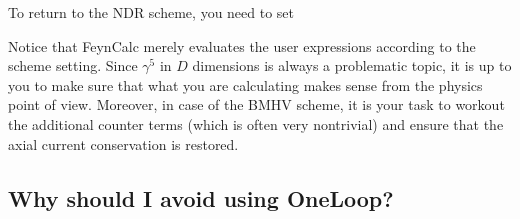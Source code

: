\documentclass[../FeynCalcManual.tex]{subfiles}
\begin{document}
\begin{Shaded}
\begin{Highlighting}[]
\OperatorTok{\{}\OperatorTok{[}\OperatorTok{],}\OperatorTok{[}\OperatorTok{],}\OperatorTok{[}\OperatorTok{,}\OperatorTok{],}\OperatorTok{[}\OperatorTok{,}\OperatorTok{]\}} 
\OperatorTok{\{}\OperatorTok{[}\OperatorTok{],}\OperatorTok{[}\OperatorTok{],}\OperatorTok{[}\OperatorTok{,}\OperatorTok{],}\OperatorTok{[}\OperatorTok{,}\OperatorTok{]\}} 
\OperatorTok{\{}\OperatorTok{[}\OperatorTok{],}\OperatorTok{[}\OperatorTok{],}\OperatorTok{[}\OperatorTok{,}\OperatorTok{],}\OperatorTok{[}\OperatorTok{,}\OperatorTok{]\}} 
\end{Highlighting}
\end{Shaded}

To return to the NDR scheme, you need to set

\begin{Shaded}
\begin{Highlighting}[]
\ExtensionTok{=}
\end{Highlighting}
\end{Shaded}

Notice that FeynCalc merely evaluates the user expressions according to
the scheme setting. Since \(\gamma^5\) in \(D\) dimensions is always a
problematic topic, it is up to you to make sure that what you are
calculating makes sense from the physics point of view. Moreover, in
case of the BMHV scheme, it is your task to workout the additional
counter terms (which is often very nontrivial) and ensure that the axial
current conservation is restored.

\subsection{Why should I avoid using
OneLoop?}\label{why-should-i-avoid-using-oneloop}
\end{document}
